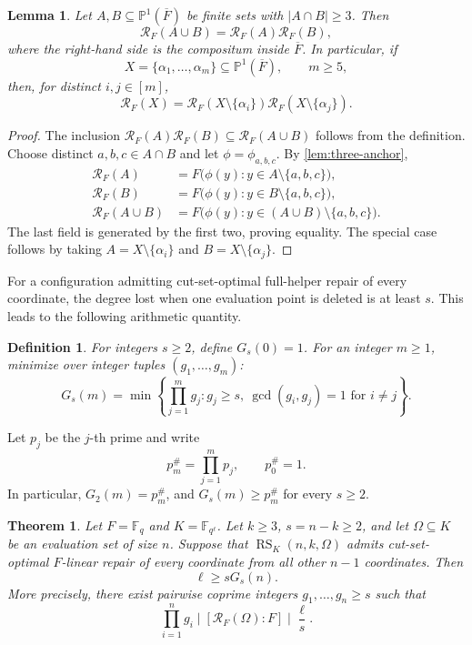 \documentclass[11pt,onecolumn]{IEEEtran}
\newtheorem{theorem}{Theorem}
\newtheorem{lemma}{Lemma}
\newtheorem{definition}{Definition}
\newcommand{\F}{\mathbb{F}}
\newcommand{\RS}{\operatorname{RS}}
\newcommand{\crf}{\mathscr R}
\newcommand{\Pone}{\mathbb P^1}
\newcommand{\primorial}[1]{p_{#1}^{\#}}
\begin{document}
\begin{lemma}
\label{lem:two-deletion}
Let $A,B\subseteq\Pone(\overline F)$ be finite sets with
$|A\cap B|\ge3$. Then
\[
\crf_F(A\cup B)=\crf_F(A)\crf_F(B),
\]
where the right-hand side is the compositum inside $\overline F$.
In particular, if
\[
X=\{\alpha_1,\ldots,\alpha_m\}\subseteq\Pone(\overline F),
\qquad m\ge5,
\]
then, for distinct $i,j\in[m]$,
\[
\crf_F(X)
=
\crf_F(X\setminus\{\alpha_i\})
\crf_F(X\setminus\{\alpha_j\}).
\]
\end{lemma}

\begin{proof}
The inclusion
$\crf_F(A)\crf_F(B)\subseteq\crf_F(A\cup B)$ follows from the
definition.  Choose distinct $a,b,c\in A\cap B$ and let
$\phi=\phi_{a,b,c}$.  By \cref{lem:three-anchor},
\begin{align*}
\crf_F(A)
&=F\bigl(\phi(y):y\in A\setminus\{a,b,c\}\bigr),\\
\crf_F(B)
&=F\bigl(\phi(y):y\in B\setminus\{a,b,c\}\bigr),\\
\crf_F(A\cup B)
&=F\bigl(\phi(y):y\in(A\cup B)\setminus\{a,b,c\}\bigr).
\end{align*}
The last field is generated by the first two, proving equality.  The
special case follows by taking
$A=X\setminus\{\alpha_i\}$ and
$B=X\setminus\{\alpha_j\}$.
\end{proof}

For a configuration admitting cut-set-optimal full-helper repair of every coordinate, the degree lost when one evaluation point is deleted is at least $s$. This leads to the following
arithmetic quantity.

\begin{definition}
\label{def:Gs}
For integers $s\ge2$, define $G_s(0)=1$.
For an integer $m\ge1$, minimize over integer tuples $(g_1,\ldots,g_m)$:
\[
G_s(m)
=
\min\left\{
\prod_{j=1}^m g_j:
 g_j\ge s,\ \gcd(g_i,g_j)=1\text{ for }i\ne j
\right\}.
\]
\end{definition}

Let $p_j$ be the $j$-th prime and write
\[
\primorial{m}=\prod_{j=1}^{m}p_j,
\qquad
\primorial{0}=1.
\]
In particular, $G_2(m)=\primorial{m}$, and
$G_s(m)\ge\primorial{m}$ for every $s\ge2$.

\begin{theorem}
\label{thm:local-G-lower}
Let $F=\F_q$ and $K=\F_{q^\ell}$.  Let $k\ge3$,
$s=n-k \ge2$,  and let $\Omega\subseteq K$ be an evaluation
set of size $n$.  Suppose that $\RS_K(n,k,\Omega)$ admits
cut-set-optimal $F$-linear repair of every coordinate from all other
$n-1$ coordinates. Then
\[
\ell\ge sG_s(n).
\]
More precisely, there exist pairwise coprime integers
$g_1,\ldots,g_n\ge s$ such that
\[
\prod_{i=1}^n g_i
\mid[\crf_F(\Omega):F]
\mid\frac{\ell}{s}.
\]
\end{theorem}
\end{document}

